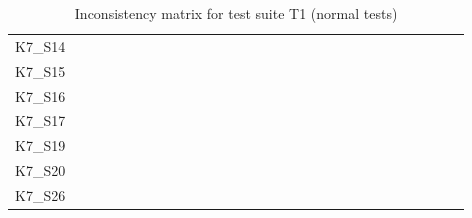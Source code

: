 \begin{table}
\begin{tabular}{l|rrrrrrrrrrrrrrrrrrrrrrrrrrrr}
        K7\_S14 & \y & \y & \y & \y & \y & \y & \y & \y & \y & \y & \y & \y & \y & \y & \y & \y & \y & \y & \y & \y & \y & \y & \y & \y & \y & \y & \y & \y \\
        K7\_S15 & \y & \y & \y & \y & \y & \y & \y & \y & \y & \y & \y & \y & \y & \y & \y & \y & \y & \y & \y & \y & \y & \y & \y & \y & \y & \y & \y & \y \\
        K7\_S16 & \y & \y & \y & \x & \y & \y & \y & \y & \y & \y & \y & \y & \y & \y & \y & \y & \y & \y & \y & \y & \y & \y & \y & \y & \y & \y & \y & \y \\
        K7\_S17 & \y & \y & \y & \y & \y & \y & \y & \y & \y & \y & \y & \y & \y & \y & \y & \y & \y & \y & \x & \y & \x & \y & \x & \x & \y & \y & \y & \y \\
        K7\_S19 & \y & \y & \y & \y & \y & \y & \y & \y & \y & \y & \y & \y & \y & \y & \y & \y & \y & \y & \y & \y & \y & \y & \y & \y & \y & \y & \y & \y \\
        K7\_S20 & \y & \y & \y & \y & \y & \y & \y & \y & \y & \y & \y & \y & \y & \y & \y & \y & \y & \y & \y & \y & \y & \y & \y & \y & \y & \y & \y & \y \\
        K7\_S26 & \y & \y & \y & \y & \y & \y & \y & \y & \y & \y & \y & \y & \y & \y & \y & \y & \y & \y & \y & \y & \y & \y & \y & \y & \y & \y & \y & \y \\
        \bottomrule
    \end{tabular}
    \caption{Inconsistency matrix for test suite T1 (normal tests)}
    \label{tab:inconsistencies_matrix_normal}
    \setlength{\tabcolsep}{\defaulttabcolsep}
\end{table}

